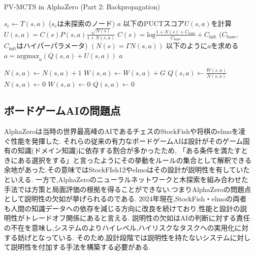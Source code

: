 \begin{algorithm}
    \caption{PV-MCTS in AlphaZero (Part 2: Backpropagation)}
    \label{alg:mcts-2}
    \begin{algorithmic}[1]
                \State $s_c \gets T(s, a)$ ($s_c$は未探索のノード)
                \State {}
                \State \Return $a$
            \Else
                \State 以下のPUCTスコア$U(s, a)$を計算
                \State $U(s, a)= C(s)P(s, a)\frac{\sqrt{N(s)}}{1+N(s, a)}$
                \State $C(s)=\textrm{log}\frac{1+N(s)+C_{\textrm{base}}}{C_{\textrm{base}}}+C_{\textrm{init}}$
                \State($C_{\textrm{base}}$, $C_{\textrm{init}}$はハイパーパラメータ)
                \State $(N(s)=\Gamma N(s, a))$
                \State 以下のように$a$を求める
                \State $a = {\textrm{argmax}}_a (Q(s, a)+U(s, a))$
                \State \Return $a$
                
            \EndIf
        \EndFunction
                \State $N(s, a) \gets  N(s, a)+1$
                \State $W(s, a) \gets  W(s, a)+G$
                \State $Q(s, a) \gets \frac{W(s, a)}{N(s, a)}$
            \EndFor
        \EndFunction
                \State $N(s, a) \gets 0$
                \State $W(s, a) \gets 0$
                \State $Q(s, a) \gets 0$
            \EndFor
        \EndFunction
    \end{algorithmic}
\end{algorithm}


\subsection{ボードゲームAIの問題点}
AlphaZeroは当時の世界最高峰のAIであるチェスのStockFish\cite{StockFish}や将棋のelmo\cite{elmo}を凌ぐ性能を発揮した.
それらの従来の有力なボードゲームAIは設計がそのゲーム固有の知識(ドメイン知識)に依存する割合が多かったため,
「ある条件を満たすときにある選択をする」と言ったようにその挙動をルールの集合として解釈できる余地があった.その意味ではStockFIsh12やelmoはその設計が説明性を有していたといえる.
一方で,AlphaZeroのニューラルネットワークと木探索を組み合わせた手法では方策と局面評価の根拠を得ることができない.つまりAlphaZeroの問題点として説明性の欠如が挙げられるのである.
2024年現在,StockFish・elmoの両者も人間の知識データへの依存を減じる方向に改良を続けており,性能と設計の説明性がトレードオフ関係にあると言える\cite{elmo}\cite{StockFish13}.
説明性の欠如はAIの判断に対する責任の不在を意味し,システムのよりハイレベル,ハイリスクなタスクへの実用化に対する妨げとなっている.
そのため,設計段階では説明性を持たないシステムに対して説明性を付加する手法を構築する必要がある.




